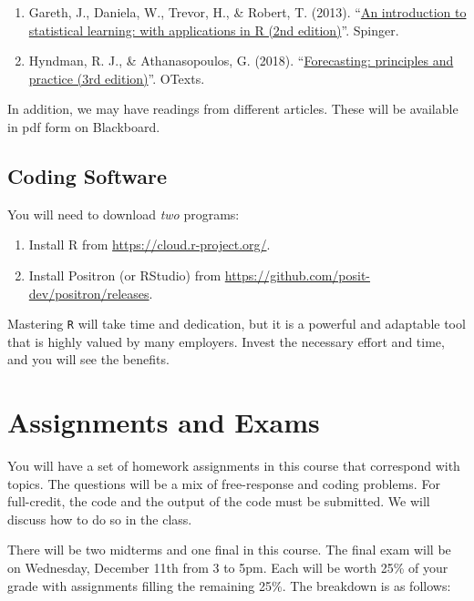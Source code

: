 \documentclass[12pt]{article}
\begin{document}
\begin{enumerate}
  \item Gareth, J., Daniela, W., Trevor, H., \& Robert, T. (2013). ``\href{https://www.statlearning.com}{An introduction to statistical learning: with applications in R (2nd edition)}''. Spinger.
  \item Hyndman, R. J., \& Athanasopoulos, G. (2018). ``\href{https://otexts.com/fpp3/}{Forecasting: principles and practice (3rd edition)}''. OTexts.
\end{enumerate}

In addition, we may have readings from different articles. These will be available in pdf form on Blackboard.



\subsection*{Coding Software}

You will need to download \emph{two} programs:
\begin{enumerate}
  \item Install R from \url{https://cloud.r-project.org/}.
  \item Install Positron (or RStudio) from \url{https://github.com/posit-dev/positron/releases}. 
\end{enumerate}

\bigskip
Mastering \texttt{R} will take time and dedication, but it is a powerful and adaptable tool that is highly valued by many employers. Invest the necessary effort and time, and you will see the benefits.



\section*{Assignments and Exams}

You will have a set of homework assignments in this course that correspond with topics. The questions will be a mix of free-response and coding problems. For full-credit, the code and the output of the code must be submitted. We will discuss how to do so in the class. 

There will be two midterms and one final in this course. The final exam will be on Wednesday, December 11th from 3 to 5pm. Each will be worth 25\% of your grade with assignments filling the remaining 25\%. The breakdown is as follows:
\end{document}
